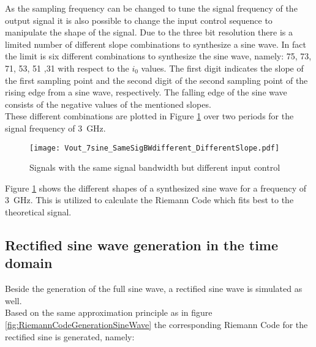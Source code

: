 As the sampling frequency can be changed to tune the signal frequency of the output signal it is also possible to change the input control sequence to manipulate the shape of the signal.
Due to the three bit resolution there is a limited number of different slope combinations to synthesize a sine wave.
In fact the limit is six different combinations to synthesize the sine wave, namely: 75, 73, 71, 53, 51 ,31 with respect to the $i_0$ values.
The first digit indicates the slope of the first sampling point and the second digit of the second sampling point of the rising edge from a sine wave, respectively. 
The falling edge of the sine wave consists of the negative values of the mentioned slopes.\\

These different combinations are plotted in Figure \ref{fig:SameSigBWDifSlope} over two periods for the signal frequency of \SI{3}{\GHz}. 

\begin{figure}[htb!]
	\centering
  \texttt{[image: Vout\_7sine\_SameSigBWdifferent\_DifferentSlope.pdf]}
	\caption{Signals with the same signal bandwidth but different input control}
	\label{fig:SameSigBWDifSlope}
\end{figure}

Figure \ref{fig:SameSigBWDifSlope} shows the different shapes of a synthesized sine wave for a frequency of \SI{3}{\GHz}.
This is utilized to calculate the Riemann Code which fits best to the theoretical signal.


\subsection{Rectified sine wave generation in the time domain}
Beside the generation of the full sine wave, a rectified sine wave is simulated as well.\\
Based on the same approximation principle as in figure \ref{fig:RiemannCodeGenerationSineWave} the corresponding Riemann Code for the rectified sine is generated, namely:



